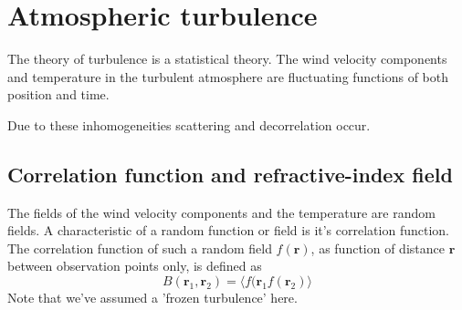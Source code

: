 \section{Atmospheric turbulence}

The theory of turbulence is a statistical theory.
The wind velocity components and temperature in the turbulent atmosphere are fluctuating functions of both position and time.

Due to these inhomogeneities scattering and decorrelation occur.





\subsection{Correlation function and refractive-index field}


% 


The fields of the wind velocity components and the temperature are random fields.
A characteristic of a random function or field is it's correlation function. \cite{Tatarskii1971}
The correlation function of such a random field $f(\mathbf{r})$, as function of distance $\mathbf{r}$ between observation points only, is defined as
\begin{equation}
 B(\mathbf{r}_1, \mathbf{r}_2) = \langle f(\mathbf{r}_1  f(\mathbf{r}_2) \rangle
\end{equation}
Note that we've assumed a 'frozen turbulence' here. 

